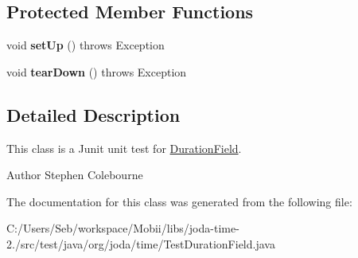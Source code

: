 \subsection*{Protected Member Functions}
\begin{DoxyCompactItemize}
\item 
\hypertarget{classorg_1_1joda_1_1time_1_1_test_duration_field_a61133db9d2939b49759fd2df5541eaf5}{void {\bfseries set\-Up} ()  throws Exception }\label{classorg_1_1joda_1_1time_1_1_test_duration_field_a61133db9d2939b49759fd2df5541eaf5}

\item 
\hypertarget{classorg_1_1joda_1_1time_1_1_test_duration_field_aa58766adabe109224a6a660b7eb1b0e8}{void {\bfseries tear\-Down} ()  throws Exception }\label{classorg_1_1joda_1_1time_1_1_test_duration_field_aa58766adabe109224a6a660b7eb1b0e8}

\end{DoxyCompactItemize}


\subsection{Detailed Description}
This class is a Junit unit test for \hyperlink{classorg_1_1joda_1_1time_1_1_duration_field}{Duration\-Field}.

\begin{DoxyAuthor}{Author}
Stephen Colebourne 
\end{DoxyAuthor}


The documentation for this class was generated from the following file\-:\begin{DoxyCompactItemize}
\item 
C\-:/\-Users/\-Seb/workspace/\-Mobii/libs/joda-\/time-\/2./src/test/java/org/joda/time/Test\-Duration\-Field.\-java\end{DoxyCompactItemize}
